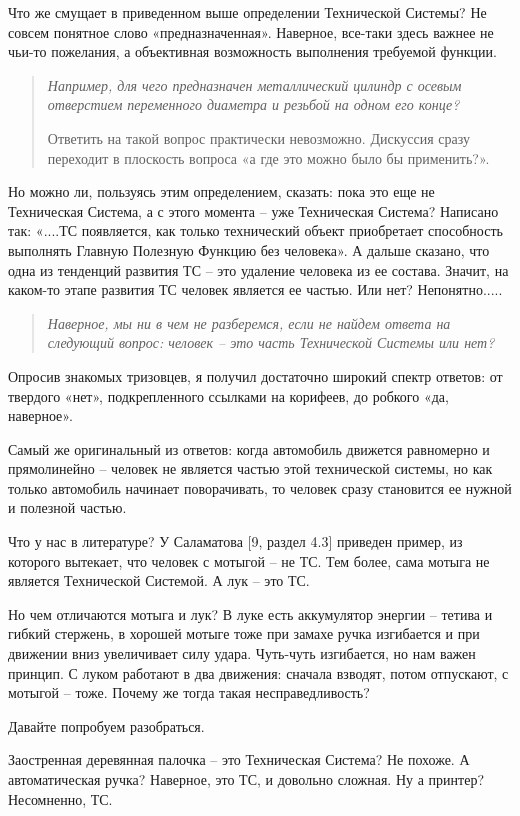 \documentclass[11pt,a4paper]{article}
\begin{document}
Что же смущает в приведенном выше определении Технической Системы? Не совсем
понятное слово «предназначенная». Наверное, все-таки здесь важнее не чьи-то
пожелания, а объективная возможность выполнения требуемой функции.
\begin{quote}\it
  Например, для чего предназначен металлический цилиндр с осевым отверстием
  переменного диаметра и резьбой на одном его конце?

Ответить на такой вопрос практически невозможно. Дискуссия сразу переходит в
плоскость вопроса «а где это можно было бы применить?».
\end{quote}

Но можно ли, пользуясь этим определением, сказать: пока это еще не Техническая
Система, а с этого момента – уже Техническая Система? Написано так: «....ТС
появляется, как только технический объект приобретает способность выполнять
Главную Полезную Функцию без человека». А дальше сказано, что одна из
тенденций развития ТС – это удаление человека из ее состава. Значит, на
каком-то этапе развития ТС человек является ее частью. Или нет?
Непонятно.....
\begin{quote}\it
  Наверное, мы ни в чем не разберемся, если не найдем ответа на следующий
  вопрос: человек – это часть Технической Системы или нет?
\end{quote}

Опросив знакомых тризовцев, я получил достаточно широкий спектр ответов: от
твердого «нет», подкрепленного ссылками на корифеев, до робкого «да,
наверное».

Самый же оригинальный из ответов: когда автомобиль движется равномерно и
прямолинейно – человек не является частью этой технической системы, но как
только автомобиль начинает поворачивать, то человек сразу становится ее нужной
и полезной частью.

Что у нас в литературе? У Саламатова [9, раздел 4.3] приведен пример, из
которого вытекает, что человек с мотыгой – не ТС. Тем более, сама мотыга не
является Технической Системой. А лук – это ТС.

Но чем отличаются мотыга и лук? В луке есть аккумулятор энергии – тетива и
гибкий стержень, в хорошей мотыге тоже при замахе ручка изгибается и при
движении вниз увеличивает силу удара. Чуть-чуть изгибается, но нам важен
принцип. С луком работают в два движения: сначала взводят, потом отпускают, с
мотыгой – тоже. Почему же тогда такая несправедливость?

Давайте попробуем разобраться. 

Заостренная деревянная палочка – это Техническая Система? Не похоже. А
автоматическая ручка? Наверное, это ТС, и довольно сложная. Ну а принтер?
Несомненно, ТС.
\end{document}
